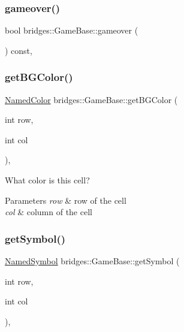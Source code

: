 \subsubsection{\texorpdfstring{gameover()}{gameover()}}
{\footnotesize\ttfamily bool bridges\+::\+Game\+Base\+::gameover (\begin{DoxyParamCaption}{ }\end{DoxyParamCaption}) const\hspace{0.3cm}{\ttfamily [inline]}, {\ttfamily [protected]}}

\mbox{\label{classbridges_1_1_game_base_ab56452f544bd4090886b911f12bac3b6}} 
\subsubsection{\texorpdfstring{get\+B\+G\+Color()}{getBGColor()}}
{\footnotesize\ttfamily \hyperlink{namespacebridges_ad811207d8898a7fd6b72a74725e68357}{Named\+Color} bridges\+::\+Game\+Base\+::get\+B\+G\+Color (\begin{DoxyParamCaption}\item[{int}]{row,  }\item[{int}]{col }\end{DoxyParamCaption})\hspace{0.3cm}{\ttfamily [inline]}, {\ttfamily [protected]}}



What color is this cell? 


\begin{DoxyParams}{Parameters}
{\em row} & row of the cell \\
\hline
{\em col} & column of the cell \\
\hline
\end{DoxyParams}
\mbox{\label{classbridges_1_1_game_base_a95527dc7b0294883f27a380c3a27e78e}} 
\subsubsection{\texorpdfstring{get\+Symbol()}{getSymbol()}}
{\footnotesize\ttfamily \hyperlink{namespacebridges_acfb0a4f7877d8f63de3e6862004c50ed}{Named\+Symbol} bridges\+::\+Game\+Base\+::get\+Symbol (\begin{DoxyParamCaption}\item[{int}]{row,  }\item[{int}]{col }\end{DoxyParamCaption})\hspace{0.3cm}{\ttfamily [inline]}, {\ttfamily [protected]}}



